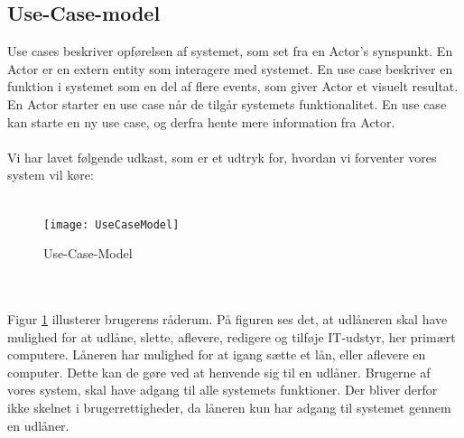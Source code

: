\documentclass[a4paper]{article}
\begin{document}
\subsection{Use-Case-model}
Use cases beskriver opførelsen af systemet, som set fra en Actor’s synspunkt. En Actor er en extern entity som interagere med systemet. En use case beskriver en funktion i systemet som en del af flere events, som giver Actor et visuelt resultat. En Actor starter en use case når de tilgår systemets funktionalitet. En use case kan starte en ny use case, og derfra hente mere information fra Actor.\cite[p~42]{OOSE} \\ \\
Vi har lavet følgende udkast, som er et udtryk for, hvordan vi forventer vores system vil køre:\\ \\
\begin{figure}[h!]
\texttt{[image: UseCaseModel]}
  \caption{Use-Case-Model}
  \label{fig:USM}
  \centering
\end{figure}  \\ \\
Figur \ref{fig:USM} illusterer brugerens råderum. På figuren ses det, at udlåneren skal have mulighed for at udlåne, slette, aflevere, redigere og tilføje IT-udstyr, her primært computere. Låneren har mulighed for at igang sætte et lån, eller aflevere en computer. Dette kan de gøre ved at henvende sig til en udlåner. Brugerne af vores system, skal have adgang til alle systemets funktioner. Der bliver derfor ikke skelnet i brugerrettigheder, da låneren kun har adgang til systemet gennem en udlåner.
\newpage
\end{document}
